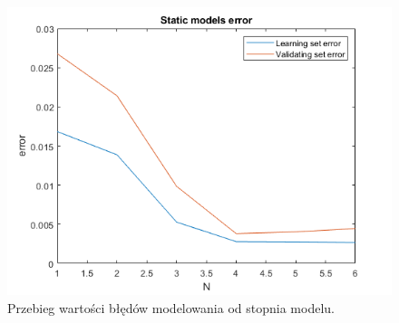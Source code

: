 \begin{figure}[H]
\centering
\includegraphics[width=15cm]{images/s_error.png}
\caption{Przebieg wartości błędów modelowania od stopnia modelu.}
\label{fig:s_error}
\end{figure}
